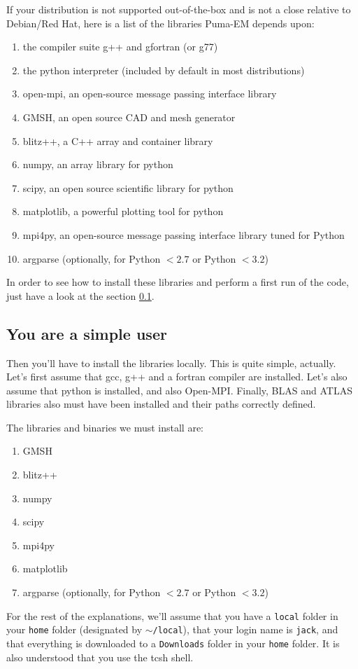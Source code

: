 \documentclass[a4paper,10pt]{book}
\begin{document}
\par
If your distribution is not supported out-of-the-box and is not a close relative to Debian/Red Hat, here is a list of the libraries Puma-EM depends upon:
\begin{enumerate}
\item the compiler suite g++ and gfortran (or g77)
\item the python interpreter (included by default in most distributions)
\item open-mpi, an open-source message passing interface library
\item GMSH, an open source CAD and mesh generator
\item blitz++, a C++ array and container library
\item numpy, an array library for python
\item scipy, an open source scientific library for python
\item matplotlib, a powerful plotting tool for python
\item mpi4py, an open-source message passing interface library tuned for Python
\item argparse (optionally, for Python $< 2.7$ or Python $< 3.2$)
\end{enumerate}
%
\par
In order to see how to install these libraries and perform a first run of the code, just have a look at the section \ref{subsec:simple_user}.


\subsection{You are a simple user}
\label{subsec:simple_user}
%
\par
Then you'll have to install the libraries locally. This is quite simple, actually. Let's first assume that gcc, g++ and a fortran compiler are installed. Let's also assume that python is installed, and also Open-MPI. Finally, BLAS and ATLAS libraries also must have been installed and their paths correctly defined.
%
\par
The libraries and binaries we must install are:
\begin{enumerate}
\item GMSH
\item blitz++
\item numpy
\item scipy
\item mpi4py
\item matplotlib
\item argparse (optionally, for Python $< 2.7$ or Python $< 3.2$)
\end{enumerate}
%
\par
For the rest of the explanations, we'll assume that you have a \texttt{local} folder in your \texttt{home} folder (designated by \texttt{$\sim$/local}), that your login name is \texttt{jack}, and that everything is downloaded to a \texttt{Downloads} folder in your \texttt{home} folder. It is also understood that you use the tcsh shell.
\end{document}
